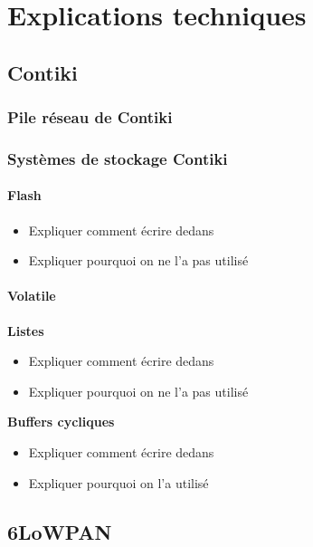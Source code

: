 \chapter{Explications techniques}
\label{sec:technique}

\section{Contiki}

	\subsection{Pile réseau de Contiki}
	
	\subsection{Systèmes de stockage Contiki}
	
		\subsubsection{Flash}
			\begin{itemize}
				\item Expliquer comment écrire dedans
				\item Expliquer pourquoi on ne l'a pas utilisé
			\end{itemize}
		\subsubsection{Volatile}
			\textbf{Listes}
			\begin{itemize}
				\item Expliquer comment écrire dedans
				\item Expliquer pourquoi on ne l'a pas utilisé
			\end{itemize}
			\textbf{Buffers cycliques}
			\begin{itemize}
				\item Expliquer comment écrire dedans
				\item Expliquer pourquoi on l'a utilisé
			\end{itemize}
		
	
\section{6LoWPAN}
